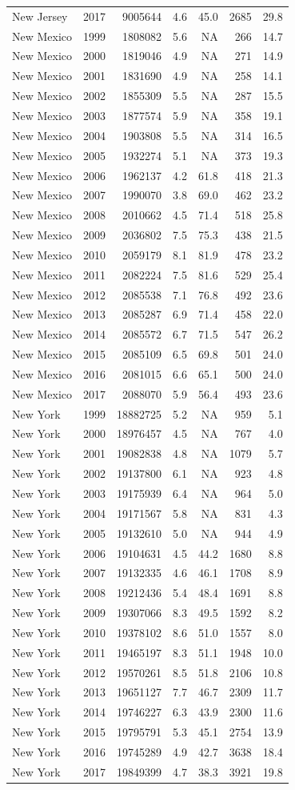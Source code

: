 \documentclass[
]{article}
\begin{document}
\begin{longtable}[]{@{}lrrrrrr@{}}
New Jersey & 2017 & 9005644 & 4.6 & 45.0 & 2685 & 29.8\tabularnewline
New Mexico & 1999 & 1808082 & 5.6 & NA & 266 & 14.7\tabularnewline
New Mexico & 2000 & 1819046 & 4.9 & NA & 271 & 14.9\tabularnewline
New Mexico & 2001 & 1831690 & 4.9 & NA & 258 & 14.1\tabularnewline
New Mexico & 2002 & 1855309 & 5.5 & NA & 287 & 15.5\tabularnewline
New Mexico & 2003 & 1877574 & 5.9 & NA & 358 & 19.1\tabularnewline
New Mexico & 2004 & 1903808 & 5.5 & NA & 314 & 16.5\tabularnewline
New Mexico & 2005 & 1932274 & 5.1 & NA & 373 & 19.3\tabularnewline
New Mexico & 2006 & 1962137 & 4.2 & 61.8 & 418 & 21.3\tabularnewline
New Mexico & 2007 & 1990070 & 3.8 & 69.0 & 462 & 23.2\tabularnewline
New Mexico & 2008 & 2010662 & 4.5 & 71.4 & 518 & 25.8\tabularnewline
New Mexico & 2009 & 2036802 & 7.5 & 75.3 & 438 & 21.5\tabularnewline
New Mexico & 2010 & 2059179 & 8.1 & 81.9 & 478 & 23.2\tabularnewline
New Mexico & 2011 & 2082224 & 7.5 & 81.6 & 529 & 25.4\tabularnewline
New Mexico & 2012 & 2085538 & 7.1 & 76.8 & 492 & 23.6\tabularnewline
New Mexico & 2013 & 2085287 & 6.9 & 71.4 & 458 & 22.0\tabularnewline
New Mexico & 2014 & 2085572 & 6.7 & 71.5 & 547 & 26.2\tabularnewline
New Mexico & 2015 & 2085109 & 6.5 & 69.8 & 501 & 24.0\tabularnewline
New Mexico & 2016 & 2081015 & 6.6 & 65.1 & 500 & 24.0\tabularnewline
New Mexico & 2017 & 2088070 & 5.9 & 56.4 & 493 & 23.6\tabularnewline
New York & 1999 & 18882725 & 5.2 & NA & 959 & 5.1\tabularnewline
New York & 2000 & 18976457 & 4.5 & NA & 767 & 4.0\tabularnewline
New York & 2001 & 19082838 & 4.8 & NA & 1079 & 5.7\tabularnewline
New York & 2002 & 19137800 & 6.1 & NA & 923 & 4.8\tabularnewline
New York & 2003 & 19175939 & 6.4 & NA & 964 & 5.0\tabularnewline
New York & 2004 & 19171567 & 5.8 & NA & 831 & 4.3\tabularnewline
New York & 2005 & 19132610 & 5.0 & NA & 944 & 4.9\tabularnewline
New York & 2006 & 19104631 & 4.5 & 44.2 & 1680 & 8.8\tabularnewline
New York & 2007 & 19132335 & 4.6 & 46.1 & 1708 & 8.9\tabularnewline
New York & 2008 & 19212436 & 5.4 & 48.4 & 1691 & 8.8\tabularnewline
New York & 2009 & 19307066 & 8.3 & 49.5 & 1592 & 8.2\tabularnewline
New York & 2010 & 19378102 & 8.6 & 51.0 & 1557 & 8.0\tabularnewline
New York & 2011 & 19465197 & 8.3 & 51.1 & 1948 & 10.0\tabularnewline
New York & 2012 & 19570261 & 8.5 & 51.8 & 2106 & 10.8\tabularnewline
New York & 2013 & 19651127 & 7.7 & 46.7 & 2309 & 11.7\tabularnewline
New York & 2014 & 19746227 & 6.3 & 43.9 & 2300 & 11.6\tabularnewline
New York & 2015 & 19795791 & 5.3 & 45.1 & 2754 & 13.9\tabularnewline
New York & 2016 & 19745289 & 4.9 & 42.7 & 3638 & 18.4\tabularnewline
New York & 2017 & 19849399 & 4.7 & 38.3 & 3921 & 19.8\tabularnewline

\end{longtable}
\end{document}
